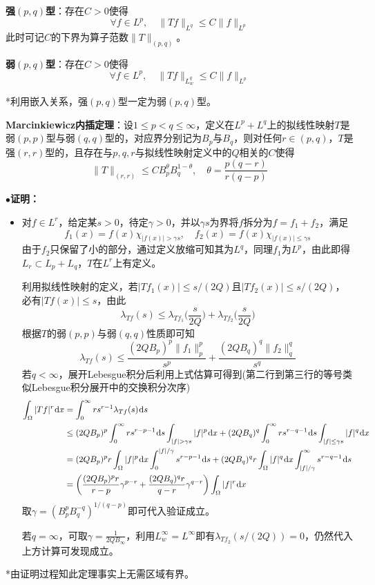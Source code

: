 \documentclass[a4paper,UTF8,fontset=windows,AutoFakeBold]{ctexart}
\newcommand*{\dr}{\hspace{0.07em}\mathrm{d}}
\newcommand{\proo}[1]{{\kaishu $\bullet$\textbf{证明：}
\begin{itemize}
    \item[] #1
\end{itemize}
}}
\begin{document}
\textbf{强$(p,q)$型}：存在$C>0$使得
$$\forall f\in L^p,\quad\|Tf\|_{L^q}\le C\|f\|_{L^p}$$
此时可记$C$的下界为算子范数$\|T\|_{(p,q)}$。

\textbf{弱$(p,q)$型}：存在$C>0$使得
$$\forall f\in L^p,\quad\|Tf\|_{L^q_w}\le C\|f\|_{L^p}$$

*利用嵌入关系，强$(p,q)$型一定为弱$(p,q)$型。

\textbf{Marcinkiewicz内插定理}：设$1\le p<q\le\infty$，定义在$L^p+L^q$上的拟线性映射$T$是弱$(p,p)$型与弱$(q,q)$型的，对应界分别记为$B_p$与$B_q$，则对任何$r\in(p,q)$，$T$是强$(r,r)$型的，且存在与$p,q,r$与拟线性映射定义中的$Q$相关的$C$使得
$$\|T\|_{(r,r)}\le CB_p^\theta B_q^{1-\theta},\quad\theta=\frac{p(q-r)}{r(q-p)}$$

\proo{
    对$f\in L^r$，给定某$s>0$，待定$\gamma>0$，并以$\gamma s$为界将$f$拆分为$f=f_1+f_2$，满足
    $$f_1(x)=f(x)\chi_{|f(x)|>\gamma s},\quad f_2(x)=f(x)\chi_{|f(x)|\le\gamma s}$$
    由于$f_2$只保留了小的部分，通过定义放缩可知其为$L^q$，同理$f_1$为$L^p$，由此即得$L_r\subset L_p+L_q$，$T$在$L^r$上有定义。

    利用拟线性映射的定义，若$|Tf_1(x)|\le s/(2Q)$且$|Tf_2(x)|\le s/(2Q)$，必有$|Tf(x)|\le s$，由此
    $$\lambda_{Tf}(s)\le\lambda_{Tf_1}\bigg(\frac{s}{2Q}\bigg)+\lambda_{Tf_2}\bigg(\frac{s}{2Q}\bigg)$$
    根据$T$的弱$(p,p)$与弱$(q,q)$性质即可知
    $$\lambda_{Tf}(s)\le\frac{(2QB_p)^p\|f_1\|_p^p}{s^p}+\frac{(2QB_q)^q\|f_2\|_q^q}{s^q}$$
    若$q<\infty$，展开Lebesgue积分后利用上式估算可得到(第二行到第三行的等号类似Lebesgue积分展开中的交换积分次序)
    $$\begin{aligned}\int_\Omega|Tf|^r\dr x&=\int_0^\infty rs^{r-1}\lambda_{Tf}(s)\dr s\\ &\le(2QB_p)^p\int_0^\infty rs^{r-p-1}\dr s\int_{|f|>\gamma s}|f|^p\dr x+(2QB_q)^q\int_0^\infty rs^{r-q-1}\dr s\int_{|f|\le\gamma s}|f|^q\dr x\\ &=(2QB_p)^pr\int_\Omega|f|^p\dr x\int_0^{|f|/\gamma}s^{r-p-1}\dr s+(2QB_q)^qr\int_\Omega|f|^q\dr x\int_{|f|/\gamma}^\infty s^{r-q-1}\dr s\\ &=\bigg(\frac{(2QB_p)^pr}{r-p}\gamma^{p-r}+\frac{(2QB_q)^qr}{q-r}\gamma^{q-r}\bigg)\int_\Omega|f|^r\dr x\end{aligned}$$
    取$\gamma=(B_p^pB_q^{-q})^{1/(q-p)}$即可代入验证成立。

    若$q=\infty$，可取$\gamma=\frac{1}{2QB_\infty}$，利用$L_w^\infty=L^\infty$即有$\lambda_{Tf_2}(s/(2Q))=0$，仍然代入上方计算可发现成立。
}

*由证明过程知此定理事实上无需区域有界。
\end{document}
